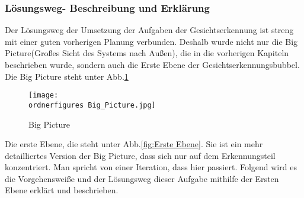 		\subsubsection{Lösungsweg- Beschreibung und Erklärung}
		Der Lösungsweg der Umsetzung der Aufgaben der Gesichtserkennung ist streng mit einer guten vorherigen Planung verbunden. Deshalb wurde nicht nur die Big Picture(Großes Sicht des Systems nach Außen), die in die vorherigen Kapiteln beschrieben wurde, sondern auch die Erste Ebene der Gesichtserkennungsbubbel.
		Die Big Picture steht unter Abb.\ref{fig:Big Picture}
		\begin{figure}[H]
			\texttt{[image: \\ordnerfigures Big\_Picture.jpg]}
			\caption{Big Picture}
			\label{fig:Big Picture}
		\end{figure}	
	Die erste Ebene, die steht unter Abb.\ref{fig:Erste Ebene}. Sie ist ein mehr detailliertes Version der Big Picture, dass sich nur auf dem Erkennungsteil konzentriert. Man spricht von einer Iteration, dass hier passiert.  Folgend wird es die Vorgehensweiße und der Lösungsweg dieser Aufgabe mithilfe der Ersten Ebene erklärt und beschrieben.\\
	
